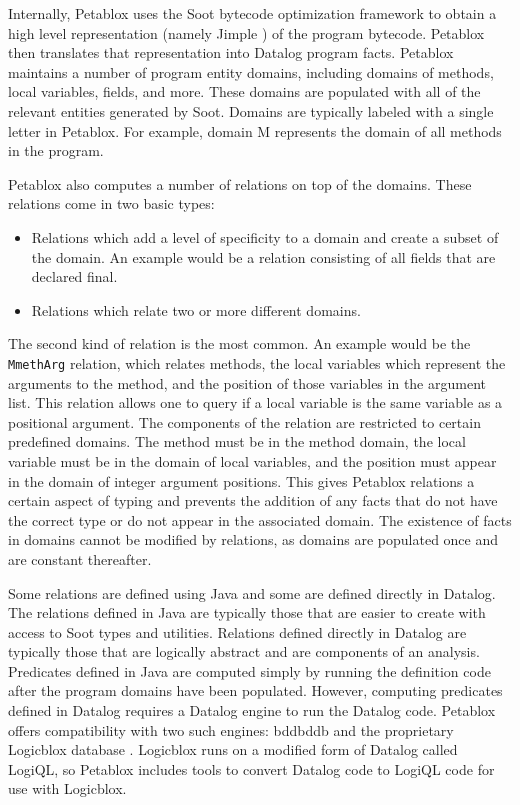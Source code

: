 Internally, Petablox uses the Soot bytecode optimization framework \cite{vallee1999soot} to obtain a high level representation (namely Jimple \cite{vallee1998jimple}) of the program bytecode. Petablox then translates that representation into Datalog program facts. Petablox maintains a number of program entity domains, including domains of methods, local variables, fields, and more. These domains are populated with all of the relevant entities generated by Soot. Domains are typically labeled with a single letter in Petablox. For example, domain M represents the domain of all methods in the program.

Petablox also computes a number of relations on top of the domains. These relations come in two basic types:

\begin{itemize}
  \item Relations which add a level of specificity to a domain and create a subset of the domain. An example would be a relation consisting of all fields that are declared final.
  \item Relations which relate two or more different domains.
\end{itemize}

The second kind of relation is the most common. An example would be the \texttt{MmethArg} relation, which relates methods, the local variables which represent the arguments to the method, and the position of those variables in the argument list. This relation allows one to query if a local variable is the same variable as a positional argument. The components of the relation are restricted to certain predefined domains. The method must be in the method domain, the local variable must be in the domain of local variables, and the position must appear in the domain of integer argument positions. This gives Petablox relations a certain aspect of typing and prevents the addition of any facts that do not have the correct type or do not appear in the associated domain. The existence of facts in domains cannot be modified by relations, as domains are populated once and are constant thereafter. 

Some relations are defined using Java and some are defined directly in Datalog. The relations defined in Java are typically those that are easier to create with access to Soot types and utilities. Relations defined directly in Datalog are typically those that are logically abstract and are components of an analysis. Predicates defined in Java are computed simply by running the definition code after the program domains have been populated. However, computing predicates defined in Datalog requires a Datalog engine to run the Datalog code. Petablox offers compatibility with two such engines: bddbddb \cite{bddbddb} and the proprietary Logicblox database \cite{logicblox}. Logicblox runs on a modified form of Datalog called LogiQL, so Petablox includes tools to convert Datalog code to LogiQL code for use with Logicblox.

